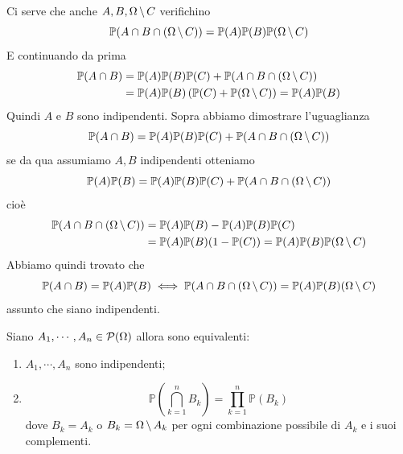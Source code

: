 \documentclass[a4paper]{article}
\begin{document}
Ci serve che anche \(A, B, \Omega \,\backslash\, C\)
verifichino
\[
    \mathbb P(A \cap B \cap (\Omega \,\backslash\, C)) = \mathbb P(A)\mathbb P(B)\mathbb P(\Omega \,\backslash\, C)
\]
E continuando da prima
\begin{align*}
    \mathbb P(A\cap B) &= \mathbb P(A)\mathbb P(B)\mathbb P(C) + \mathbb P(A \cap B \cap (\Omega \,\backslash\, C)) \\
    &= \mathbb P(A)\mathbb P(B)\left(
        \mathbb P(C) + \mathbb P(\Omega \,\backslash\, C)
    \right) = \mathbb P(A) \mathbb P(B)
\end{align*}
Quindi \(A\) e \(B\) sono indipendenti.
Sopra abbiamo dimostrare l'uguaglianza
\[
    \mathbb P(A \cap B)
    = \mathbb P(A)\mathbb P(B)\mathbb P(C) + \mathbb P(A \cap B \cap (\Omega \,\backslash\, C))
\]
se da qua assumiamo \(A,B\) indipendenti otteniamo
\[
    \mathbb P(A)\mathbb P(B) = \mathbb P(A)\mathbb P(B)\mathbb P(C)
    + \mathbb P(A \cap B \cap (\Omega \,\backslash\, C))
\]
cioè
\begin{align*}
    \mathbb P(A \cap B \cap (\Omega \,\backslash\, C))
    &= \mathbb P(A)\mathbb P(B) - \mathbb P(A)\mathbb P(B)\mathbb P(C) \\
    &= \mathbb P(A)\mathbb P(B)(1-\mathbb P(C)) = \mathbb P(A)\mathbb P(B)\mathbb P(\Omega \,\backslash\, C)
\end{align*}
Abbiamo quindi trovato che
\[
    \mathbb P(A \cap B)
    = \mathbb P(A)\mathbb P(B) \iff \mathbb P(A \cap B \cap (\Omega \,\backslash\, C)) = \mathbb P(A)\mathbb P(B)\mathbb(\Omega \,\backslash\, C)
\]
assunto che siano indipendenti.

\pagebreak

\begin{snippetproposition}{}
    Siano \(A_1, \cdots, A_n \in \mathcal P(\Omega)\) allora sono equivalenti:
    \begin{enumerate}
        \item \(A_1, \cdots, A_n\) sono indipendenti;
        \item \[
                \mathbb P \left(
                    \bigcap_{k=1}^n B_k
                \right) = \prod_{k=1}^n \mathbb P(B_k)
            \]
            dove \(B_k = A_k\) o \(B_k = \Omega \,\backslash\, A_k\)
            per ogni combinazione possibile di \(A_k\) e i suoi complementi.
    \end{enumerate}
\end{snippetproposition}
\end{document}
